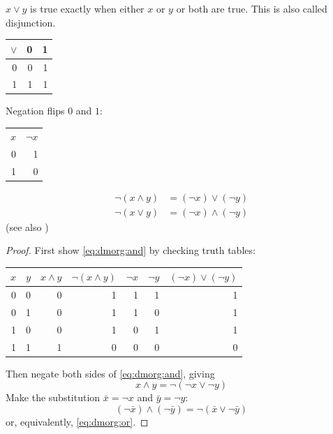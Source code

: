 \message{ !name(truth.tex)}\documentclass{scrbook}
\begin{document}
\begin{defn}[or $\vee$]
  \label{def:bool:or}
  $x \vee y$ is true exactly when either $x$ or $y$ or both are true. This is also called disjunction.
  \begin{center}
\begin{tabular}{r|rr}
$\vee$ & 0 & 1 \\
  \hline
0 & 0 & 1 \\
1 & 1 & 1 
\end{tabular}
\end{center}
\end{defn}
\begin{defn}
Negation flips $0$ and $1$:
  \begin{center}
\begin{tabular}{rr}
$x$ & $\neg x$ \\
0 & 1 \\
1 & 0 
\end{tabular}
\end{center}
\end{defn}

\begin{theorem}
  \begin{align}
    \neg(x\wedge y) &=  (\neg x) \vee (\neg y) \label{eq:dmorg:and} \\
    \neg(x \vee y) &= (\neg x) \wedge (\neg y) \label{eq:dmorg:or}
  \end{align}
  (see also \cite{wiki:demorgan})
\end{theorem}
\begin{proof}
 First show \cref{eq:dmorg:and} by checking truth tables:
 \begin{center}
\begin{tabular}{rrrrrrr}
$x$ & $y$ & $x\wedge y$ & $\neg(x\wedge y)$ & $\neg x$ & $\neg y$ & $(\neg x)\vee (\neg y)$ \\
\hline
0 & 0 & 0 & 1 & 1 & 1 & 1 \\
0 & 1 & 0 & 1 & 1 & 0 & 1 \\
1 & 0 & 0 & 1 & 0 & 1 & 1 \\
1 & 1 & 1 & 0 & 0 & 0 & 0 
\end{tabular}
\end{center}
Then negate both sides of \cref{eq:dmorg:and}, giving 
\[
x\wedge y = \neg(\neg x \vee \neg y)
\]
Make the substitution $\bar x = \neg x$ and $\bar y =\neg y$:
\[
(\neg \bar x)\wedge (\neg \bar y) = \neg(\bar x \vee \neg \bar y)
\]
or, equivalently, \cref{eq:dmorg:or}. 
\end{proof}
\end{document}
